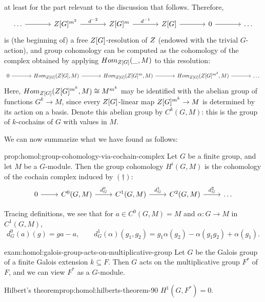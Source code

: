at least for the part relevant to the discussion that
follows. Therefore,
\[\begin{tikzcd}[column sep=large]
    \dots \arrow[r] & \Z[G]^{m^2} \arrow[r, "d^{-2}"] & \Z[G]^m
    \arrow[r, "d^{-1}"] & \Z[G] \arrow[r] & 0 \arrow[r] & \dots
  \end{tikzcd}\] is (the beginning of) a free $Z[G]$-resolution of
$Z$ (endowed with the trivial $G$-action), and group cohomology can
be computed as the cohomology of the complex obtained by applying
$Hom_{Z[G]}(\_, M)$ to this resolution:
\[\begin{tikzcd}[column sep=large]
    0 \arrow[r] & \Hom_{\Z[G]}(\Z[G], M) \arrow[r] &
    \Hom_{\Z[G]}(\Z[G]^m, M) \arrow[r] & \Hom_{\Z[G]}(\Z[G]^{m^2}, M)
    \arrow[r] & \dots
  \end{tikzcd}\] Here, $Hom_{Z[G]}(Z[G]^{m^k}, M) \cong M^{m^k}$
may be identified with the abelian group of functions $G^k \to M$,
since every $Z[G]$-linear map $Z[G]^{m^k} \to M$ is determined by
its action on a basis. Denote this abelian group by $C^k(G, M)$: this
is the group of $k$-cochains of $G$ with values in $M$.

We can now summarize what we have found as follows:

\begin{prop}{}{prop:homol:group-cohomology-via-cochain-complex}
  Let $G$ be a finite group, and let $M$ be a $G$-module. Then the
  group cohomology $H^i(G, M)$ is the cohomology of the cochain
  complex induced by $(\dagger)$:
  \[\begin{tikzcd}
      0 \arrow[r] & C^0(G, M) \arrow[r, "d_G^0"] & C^1(G, M) \arrow[r,
      "d_G^1"] & C^2(G, M) \arrow[r, "d_G^2"] & \dots
    \end{tikzcd}\]
\end{prop}

Tracing definitions, we see that for $a \in C^0(G, M) = M$ and
$\alpha : G \to M$ in $C^1(G, M)$,
\[
  d_G^0(a)(g) = ga - a, \qquad d_G^1(\alpha)(g_1, g_2) =
  g_1\alpha(g_2) - \alpha(g_1g_2) + \alpha(g_1).
\]
\begin{exam}{}{exam:homol:galois-group-acts-on-multiplicative-group}
  Let $G$ be the Galois group of a finite Galois extension
  $k \subseteq F$. Then $G$ acts on the multiplicative group $F^*$ of
  $F$, and we can view $F^*$ as a $G$-module.
\end{exam}

\begin{prop}{Hilbert's theorem}{prop:homol:hilberts-theorem-90}
  $H^1(G, F^*) = 0$.
\end{prop}

